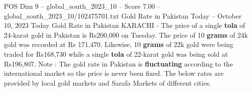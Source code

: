 \begin{textsample}{POS Dim 9 – global\_south\_2023\_10 – Score 7.00 – global\_south\_2023\_10/102475701.txt}
Gold Rate in Pakistan Today -- October 10, 2023 Today Gold Rate in Pakistan KARACHI - The price of a single \textbf{tola} of 24-karat gold in Pakistan is Rs200,000 on Tuesday.
The price of 10 \textbf{grams} of 24k gold was recorded at Rs 171,470.
Likewise, 10 \textbf{grams} of 22k gold were being traded for Rs168,730 while a single \textbf{tola} of 22-karat gold was being sold at Rs196,807.
Note : The gold rate in Pakistan is \textbf{fluctuating} according to the international market so the price is never been fixed.
The below rates are provided by local gold markets and Sarafa Markets of different cities.

\end{textsample}
